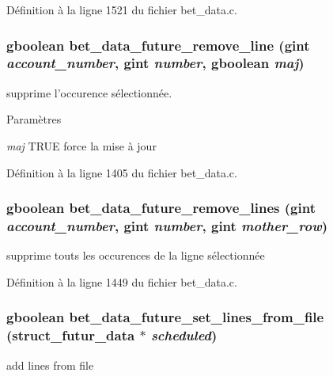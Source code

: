 Définition à la ligne 1521 du fichier bet\_\-data.c.

\subsubsection[{bet\_\-data\_\-future\_\-remove\_\-line}]{\setlength{\rightskip}{0pt plus 5cm}gboolean bet\_\-data\_\-future\_\-remove\_\-line (gint {\em account\_\-number}, \/  gint {\em number}, \/  gboolean {\em maj})}\label{bet__data_8h_a5feeffaadf0363f8d23e005000bb8518}
supprime l'occurence sélectionnée.


\begin{DoxyParams}{Paramètres}
\item[{\em maj}]TRUE force la mise à jour \end{DoxyParams}


Définition à la ligne 1405 du fichier bet\_\-data.c.

\subsubsection[{bet\_\-data\_\-future\_\-remove\_\-lines}]{\setlength{\rightskip}{0pt plus 5cm}gboolean bet\_\-data\_\-future\_\-remove\_\-lines (gint {\em account\_\-number}, \/  gint {\em number}, \/  gint {\em mother\_\-row})}\label{bet__data_8h_ab7c4f2f8f73676c85d7b5b8412833c2d}
supprime touts les occurences de la ligne sélectionnée 

Définition à la ligne 1449 du fichier bet\_\-data.c.

\subsubsection[{bet\_\-data\_\-future\_\-set\_\-lines\_\-from\_\-file}]{\setlength{\rightskip}{0pt plus 5cm}gboolean bet\_\-data\_\-future\_\-set\_\-lines\_\-from\_\-file ({\bf struct\_\-futur\_\-data} $\ast$ {\em scheduled})}\label{bet__data_8h_af0aa62f96e076cc583fa339a7a2ecc48}
add lines from file 


